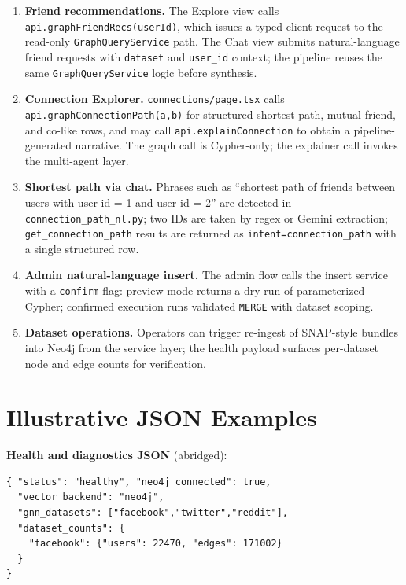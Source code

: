 \documentclass[conference]{IEEEtran}
\begin{document}
\begin{enumerate}
  \item \textbf{Friend recommendations.} The Explore view calls \texttt{api.graphFriendRecs(userId)}, which issues a typed client request to the read-only \texttt{GraphQueryService} path. The Chat view submits natural-language friend requests with \texttt{dataset} and \texttt{user\_id} context; the pipeline reuses the same \texttt{GraphQueryService} logic before synthesis.
  \item \textbf{Connection Explorer.} \texttt{connections/page.tsx} calls \texttt{api.graphConnectionPath(a,b)} for structured shortest-path, mutual-friend, and co-like rows, and may call \texttt{api.explainConnection} to obtain a pipeline-generated narrative. The graph call is Cypher-only; the explainer call invokes the multi-agent layer.
  \item \textbf{Shortest path via chat.} Phrases such as ``shortest path of friends between users with user id = 1 and user id = 2'' are detected in \texttt{connection\_path\_nl.py}; two IDs are taken by regex or Gemini extraction; \texttt{get\_connection\_path} results are returned as \texttt{intent=connection\_path} with a single structured row.
  \item \textbf{Admin natural-language insert.} The admin flow calls the insert service with a \texttt{confirm} flag: preview mode returns a dry-run of parameterized Cypher; confirmed execution runs validated \texttt{MERGE} with dataset scoping.
  \item \textbf{Dataset operations.} Operators can trigger re-ingest of SNAP-style bundles into Neo4j from the service layer; the health payload surfaces per-dataset node and edge counts for verification.
\end{enumerate}

\section{Illustrative JSON Examples}

\noindent\textbf{Health and diagnostics JSON} (abridged):
\begin{lstlisting}[basicstyle=\ttfamily\tiny]
{ "status": "healthy", "neo4j_connected": true,
  "vector_backend": "neo4j",
  "gnn_datasets": ["facebook","twitter","reddit"],
  "dataset_counts": {
    "facebook": {"users": 22470, "edges": 171002}
  }
}
\end{lstlisting}
\end{document}
